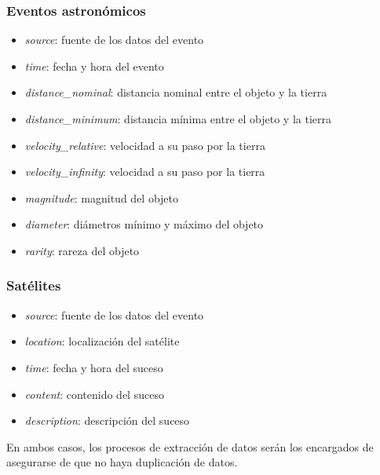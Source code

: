 \subsubsection*{Eventos astronómicos}
\begin{itemize}
  \item \textit{source}: fuente de los datos del evento
  \item \textit{time}: fecha y hora del evento
  \item \textit{distance\_nominal}: distancia nominal entre el objeto y la tierra
  \item \textit{distance\_minimum}: distancia mínima entre el objeto y la tierra
  \item \textit{velocity\_relative}: velocidad a su paso por la tierra
  \item \textit{velocity\_infinity}: velocidad a su paso por la tierra
  \item \textit{magnitude}: magnitud del objeto
  \item \textit{diameter}: diámetros mínimo y máximo del objeto
  \item \textit{rarity}: rareza del objeto
\end{itemize}


\subsubsection*{Satélites}
\begin{itemize}
  \item \textit{source}: fuente de los datos del evento
  \item \textit{location}: localización del satélite
  \item \textit{time}: fecha y hora del suceso
  \item \textit{content}: contenido del suceso
  \item \textit{description}: descripción del suceso
\end{itemize}


En ambos casos, los procesos de extracción de datos serán los encargados de
asegurarse de que no haya duplicación de datos.